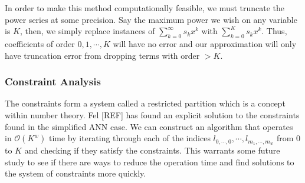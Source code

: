 In order to make this method computationally feasible, we must truncate the power series at some precision. Say the maximum power we wish on any variable is $K$, then, we simply replace instances of $\sum_{k=0}^{\infty} s_k x^k$ with $\sum_{k=0}^{K} s_k x^k$. Thus, coefficients of order $0, 1, \cdots, K$ will have no error and our approximation will only have truncation error from dropping terms with order $> K$.

\subsubsection{Constraint Analysis}

The constraints form a system called a restricted partition which is a concept within number theory. Fel [REF] has found an explicit solution to the constraints found in the simplified ANN case. We can construct an algorithm that operates in $\mathcal{O}(K^w)$ time by iterating through each of the indices $l_{0, \cdots, 0}, \cdots, l_{m_1, \cdots, m_w}$ from $0$ to $K$ and checking if they satisfy the constraints. This warrants some future study to see if there are ways to reduce the operation time and find solutions to the system of constraints more quickly.


